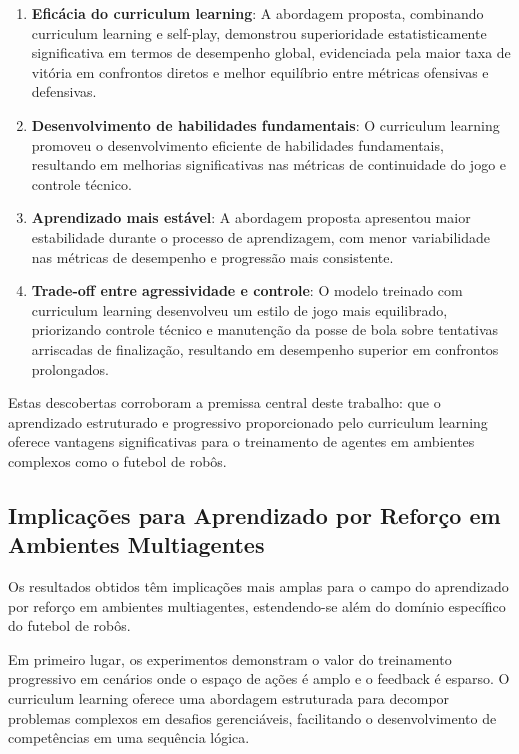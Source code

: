 \begin{enumerate}
    \item \textbf{Eficácia do curriculum learning}: A abordagem proposta, combinando curriculum learning e self-play, demonstrou superioridade estatisticamente significativa em termos de desempenho global, evidenciada pela maior taxa de vitória em confrontos diretos e melhor equilíbrio entre métricas ofensivas e defensivas.
    
    \item \textbf{Desenvolvimento de habilidades fundamentais}: O curriculum learning promoveu o desenvolvimento eficiente de habilidades fundamentais, resultando em melhorias significativas nas métricas de continuidade do jogo e controle técnico.
    
    \item \textbf{Aprendizado mais estável}: A abordagem proposta apresentou maior estabilidade durante o processo de aprendizagem, com menor variabilidade nas métricas de desempenho e progressão mais consistente.
    
    \item \textbf{Trade-off entre agressividade e controle}: O modelo treinado com curriculum learning desenvolveu um estilo de jogo mais equilibrado, priorizando controle técnico e manutenção da posse de bola sobre tentativas arriscadas de finalização, resultando em desempenho superior em confrontos prolongados.
\end{enumerate}

Estas descobertas corroboram a premissa central deste trabalho: que o aprendizado estruturado e progressivo proporcionado pelo curriculum learning oferece vantagens significativas para o treinamento de agentes em ambientes complexos como o futebol de robôs.

\subsection{Implicações para Aprendizado por Reforço em Ambientes Multiagentes}

Os resultados obtidos têm implicações mais amplas para o campo do aprendizado por reforço em ambientes multiagentes, estendendo-se além do domínio específico do futebol de robôs.

Em primeiro lugar, os experimentos demonstram o valor do treinamento progressivo em cenários onde o espaço de ações é amplo e o feedback é esparso. O curriculum learning oferece uma abordagem estruturada para decompor problemas complexos em desafios gerenciáveis, facilitando o desenvolvimento de competências em uma sequência lógica.

